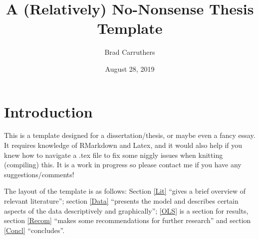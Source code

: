 \documentclass[12pt,preprint, authoryear]{article}
\title{A (Relatively) No-Nonsense Thesis Template}
\author{Brad Carruthers}
\date{August 28, 2019}
\numberwithin{equation}{section}
\numberwithin{figure}{section}
\numberwithin{table}{section}
\begin{document}
\pagestyle{fancy}
\chead{}
\rhead{}
\lfoot{}
\rfoot{} 
\lhead{}
\cfoot{\footnotesize \thepage\\}







\maketitle
\thispagestyle{empty}




\clearpage

\setcounter{page}{1}

\renewcommand{\contentsname}{Contents}
\hypersetup{linkcolor=black}
\tableofcontents
\newpage
\hypersetup{linkcolor=black}
\listoftables
\newpage
\hypersetup{linkcolor=black}
\listoffigures
\hypersetup{linkcolor=black}
\newpage


\renewcommand{\vec}[1]{\mathbf{#1}}



\section{\texorpdfstring{Introduction
\label{Intro}}{Introduction }}\label{introduction}

This is a template designed for a dissertation/thesis, or maybe even a
fancy essay. It requires knowledge of RMarkdown and Latex, and it would
also help if you knew how to navigate a .tex file to fix some niggly
issues when knitting (compiling) this. It is a work in progress so
please contact me if you have any suggestions/comments!

The layout of the template is as follows: Section \ref{Lit} ``gives a
brief overview of relevant literature''; section \ref{Data} ``presents
the model and describes certain aspects of the data descriptively and
graphically''; \ref{OLS} is a section for results, section \ref{Recom}
``makes some recommendations for further research'' and section
\ref{Concl} ``concludes''.
\end{document}

